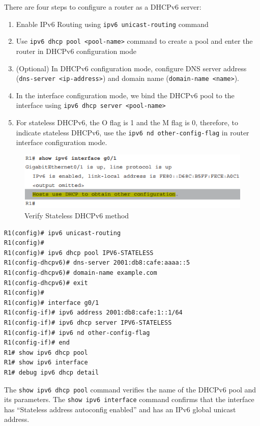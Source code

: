 There are four steps to configure a router as a DHCPv6 server:

\begin{enumerate}
\item Enable IPv6 Routing using \verb|ipv6 unicast-routing| command
\item Use \verb|ipv6 dhcp pool <pool-name>| command to create a pool and enter the router in DHCPv6 configuration mode
\item (Optional) In DHCPv6 configuration mode, configure DNS server address (\verb|dns-server <ip-address>|) and domain name (\verb|domain-name <name>|).
\item In the interface configuration mode, we bind the DHCPv6 pool to the interface using \verb|ipv6 dhcp server <pool-name>|
\item For stateless DHCPv6, the O flag is 1 and the M flag is 0, therefore, to indicate stateless DHCPv6, use the \verb|ipv6 nd other-config-flag| in router interface configuration mode.
\end{enumerate}

\begin{figure}[hbtp]
\caption{Verify Stateless DHCPv6 method}
\centering
\includegraphics[scale=0.8]{pictures/Stateless-DHCPv6.PNG}
\end{figure}


\begin{verbatim}
R1(config)# ipv6 unicast-routing
R1(config)#
R1(config)# ipv6 dhcp pool IPV6-STATELESS
R1(config-dhcpv6)# dns-server 2001:db8:cafe:aaaa::5
R1(config-dhcpv6)# domain-name example.com
R1(config-dhcpv6)# exit
R1(config)#
R1(config)# interface g0/1
R1(config-if)# ipv6 address 2001:db8:cafe:1::1/64
R1(config-if)# ipv6 dhcp server IPV6-STATELESS
R1(config-if)# ipv6 nd other-config-flag
R1(config-if)# end
R1# show ipv6 dhcp pool 
R1# show ipv6 interface
R1# debug ipv6 dhcp detail
\end{verbatim}

The \verb|show ipv6 dhcp pool| command verifies the name of the DHCPv6 pool and its parameters. The \verb|show ipv6 interface| command  confirms that the interface has ``Stateless address autoconfig enabled'' and has an IPv6 global unicast address. 


